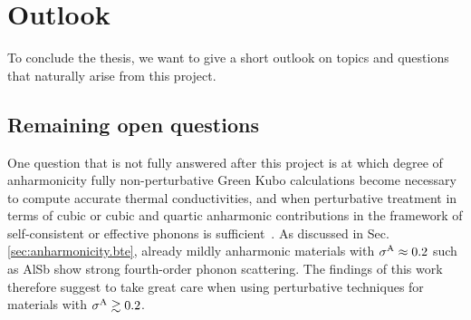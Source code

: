 

\section*{Outlook}
To conclude the thesis, we want to give a short outlook on topics and questions that naturally arise from this project.


\subsection*{Remaining open questions}
\label{sec:outlook.open_questions}
One question that is not fully answered after this project is at which degree of anharmonicity fully non-perturbative Green Kubo calculations become necessary to compute accurate thermal conductivities, and when perturbative treatment in terms of cubic or cubic and quartic anharmonic contributions in the framework of self-consistent or effective phonons is sufficient~\cite{Hellman.2013b,Feng.2016,Tadano.2018zm7,Xia.2018,Ravichandran.2018}.
As discussed in Sec.\,\ref{sec:anharmonicity.bte}, already mildly anharmonic materials with $\sigma^\mathrm{A} \approx 0.2$ such as AlSb show strong fourth-order phonon scattering. The findings of this work therefore suggest to take great care when using perturbative techniques for materials with $\sigma^\mathrm{A} \gtrsim 0.2$.

